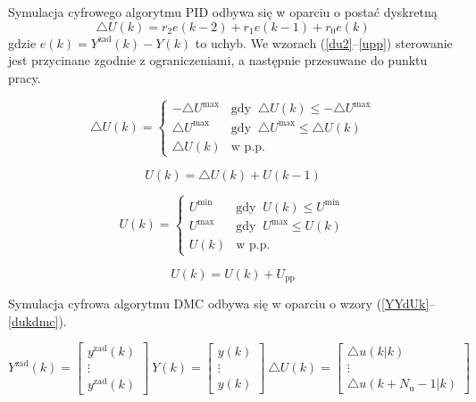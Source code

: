 Symulacja cyfrowego algorytmu PID odbywa się w oparciu o postać dyskretną
\begin{equation}
\triangle U(k) = r_2 e(k-2) + r_1 e(k-1) + r_0 e(k)
\label{du}
\end{equation}
gdzie $e(k)=Y^{\mathrm{zad}}(k) - Y(k)$ to uchyb. We wzorach (\ref{du2}--\ref{upp}) sterowanie jest przycinane zgodnie z ograniczeniami, a następnie przesuwane do punktu pracy.

\begin{equation}
\triangle U(k) = 
\begin{cases}
-\triangle U^{\mathrm{max}} & \textrm{gdy } \ \triangle U(k) \le -\triangle U^{\mathrm{max}} \\
\triangle U^{\mathrm{max}} & \textrm{gdy } \ \triangle U^{\mathrm{max}} \le \triangle U(k) \\
\triangle U(k) & \textrm{w p.p.}
\end{cases}
\label{du2}
\end{equation}

\begin{equation}
U(k) = \triangle U(k) + U(k-1)
\label{uk}
\end{equation}

\begin{equation}
U(k) = 
\begin{cases}
U^{\mathrm{min}} & \textrm{gdy } \ U(k) \le U^{\mathrm{min}} \\
U^{\mathrm{max}} & \textrm{gdy } \ U^{\mathrm{max}} \le U(k) \\
U(k) & \textrm{w p.p.}
\end{cases}
\label{uk2}
\end{equation}

\begin{equation}
U(k) = U(k) + U_{\mathrm{pp}}
\label{upp}
\end{equation}

Symulacja cyfrowa algorytmu DMC odbywa się w oparciu o wzory (\ref{YYdUk}--\ref{dukdmc}).

\begin{equation}
Y^{\mathrm{zad}}(k)=\left[
\begin{array}{c}
y^{\mathrm{zad}}(k)\\
\vdots\\
y^{\mathrm{zad}}(k)
\end{array}
\right] \
Y(k)=\left[
\begin{array}{c}
y(k)\\
\vdots\\
y(k)
\end{array}
\right] \
\triangle U(k)=\left[
\begin{array}{c}
\triangle u(k|k)\\
\vdots\\
\triangle u(k+N_{\mathrm{u}}-1|k)
\end{array}
\right] \
\label{YYdUk}
\end{equation}


